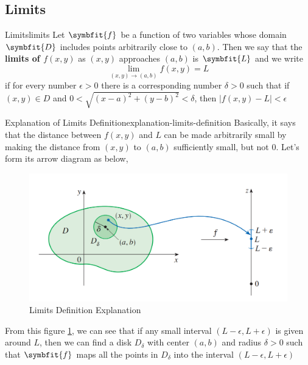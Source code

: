 \documentclass[math,code]{amznotes}
\theoremstyle{remark}
\begin{document}
\subsection{Limits}
\begin{dfnbox}{Limits}{limits}
    Let $\symbfit{f}$ be a function of two variables whose domain $\symbfit{D}$ includes points arbitrarily close to $(a,b)$. Then we say that the {\color{red} \textbf{limits of $f(x,y)$} as $(x,y)$ approaches $(a,b)$} is $\symbfit{L}$ and we write
    \begin{displaymath}
        \lim\limits_{(x,y) \to (a,b)} f(x,y) = L
    \end{displaymath}
    if for every number $\epsilon > 0$ there is a corresponding number $\delta > 0$ such that if $(x,y) \in D$ and $0 < \sqrt{(x-a)^2+(y-b)^2} < \delta$, then $\mid f(x,y) - L \mid < \epsilon$
\end{dfnbox}
\begin{exbox}{Explanation of Limits Definition}{explanation-limits-definition}
    Basically, it says that the distance between $f(x,y)$ and $L$ can be made arbitrarily small by making the distance from $(x,y)$ to $(a,b)$ sufficiently small, but not $0$. Let's form its arrow diagram as below,
    \begin{figure}[H]
        \centering
        \includegraphics[width=0.5\linewidth]{images/limits-illustration.png}
        \caption{Limits Definition Explanation}
        \label{fig:limits-definition-explanation}
    \end{figure}
    From this figure \ref{fig:limits-definition-explanation}, we can see that if any small interval $(L - \epsilon, L + \epsilon)$ is given around $L$, then we can find a disk $D_\delta$ with center $(a,b)$ and radius $\delta > 0$ such that $\symbfit{f}$ maps all the points in $D_\delta$  into the interval $(L - \epsilon, L + \epsilon)$
\end{exbox}
\end{document}
